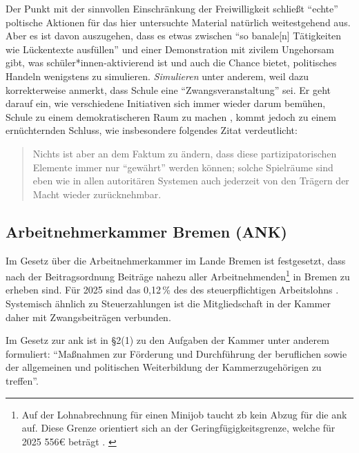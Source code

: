 Der Punkt mit der sinnvollen Einschränkung der Freiwilligkeit schließt \enquote{echte} poltische Aktionen für das hier untersuchte Material natürlich weitestgehend aus. Aber es ist davon auszugehen, dass es etwas zwischen \enquote{so banale[n] Tätigkeiten wie Lückentexte ausfüllen} \autocite[466]{Nonnenmacher2010} und einer Demonstration mit zivilem Ungehorsam gibt, was schüler*innen-aktivierend ist und auch die Chance bietet, politisches Handeln wenigstens zu simulieren. 
\emph{Simulieren} unter anderem, weil \textcite[467]{Nonnenmacher2010} dazu korrekterweise anmerkt, dass Schule eine \enquote{Zwangsveranstaltung} sei. Er geht darauf ein, wie verschiedene Initiativen sich immer wieder darum bemühen, Schule zu einem demokratischeren Raum zu machen \autocite[467-469]{Nonnenmacher2010}, kommt jedoch zu einem ernüchternden Schluss, wie insbesondere folgendes Zitat verdeutlicht:
\begin{quote}
    Nichts ist aber an dem Faktum zu ändern, dass diese partizipatorischen Elemente immer nur \enquote{gewährt} werden können; solche Spielräume sind eben wie in allen autoritären Systemen auch jederzeit von den Trägern der Macht wieder zurücknehmbar. 

    \autocite[468]{Nonnenmacher2010}
\end{quote}



\subsection{Arbeitnehmerkammer Bremen (ANK) \label{ank}}
Im Gesetz über die Arbeitnehmerkammer im Lande Bremen \autocite[]{ArbnkG} ist festgesetzt, dass nach der Beitragsordnung \autocite[]{ArbnkB} Beiträge nahezu aller Arbeitnehmenden\footnote{ 
    Auf der Lohnabrechnung für einen Minijob taucht \gls{zb} kein Abzug für die \gls{ank} auf. Diese Grenze orientiert sich an der Geringfügigkeitsgrenze, welche für 2025 556€ beträgt \autocites{b.gering}{banz.gering}. \label{Geringfügigkeitsgrenze}} 
in Bremen zu erheben sind. Für 2025 sind das 0,12\,\% des des steuerpflichtigen Arbeitslohns \autocite{ANKBeitragAb2025}. Systemisch ähnlich zu Steuerzahlungen ist die Mitgliedschaft in der Kammer daher mit Zwangsbeiträgen verbunden. 

Im Gesetz zur \gls{ank} ist in \S2(1) \autocite[1]{ArbnkG} zu den Aufgaben der Kammer unter anderem formuliert: \enquote{Maßnahmen zur Förderung und Durchführung der beruflichen sowie der allgemeinen und politischen Weiterbildung der Kammerzugehörigen zu treffen}.

